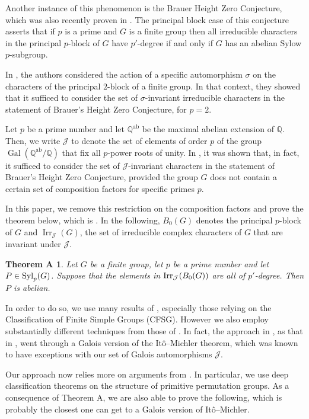 \documentclass[12pt]{amsart}
\theoremstyle{theorem}
\newtheorem*{thmA}{Theorem A}
\theoremstyle{definition}
\newcommand{\Irr}{{\operatorname{Irr}}}
\begin{document}
	Another instance of this phenomenon is the Brauer Height Zero Conjecture, which was also recently proven in \cite{BHZ}. The principal block case of this conjecture asserts that if $p$ is a prime and $G$ is a finite group then all irreducible characters in the principal $p$-block of $G$ have $p'$-degree if and only if $G$ has an abelian Sylow $p$-subgroup. 
	
	 In \cite{MN}, the authors considered the action of a specific automorphism $\sigma$ on the characters of the principal $2$-block of a finite group. In that context, they showed that it sufficed to consider the set of $\sigma$-invariant irreducible characters in the statement of Brauer's Height Zero Conjecture, for $p = 2$.
	 
	 Let $p$ be a prime number and let $\mathbb{Q}^{\operatorname{ab}}$ be the maximal abelian extension of $\mathbb{Q}$. Then, we write $\mathcal{J}$ to denote the set of elements of order $p$ of the group $\operatorname{Gal}(\mathbb{Q}^{\operatorname{ab}}/\mathbb{Q})$ that fix all $p$-power roots of unity. In \cite{MMRSF}, it was shown that, in fact, it sufficed to consider the set of $\mathcal{J}$-invariant characters in the statement of Brauer's Height Zero Conjecture, provided the group $G$ does not contain a certain set of composition factors for specific primes $p$.
	
	In this paper, we remove this restriction on the composition factors and prove the theorem below, which is \cite[Conjecture 1]{MMRSF}. In the following, $B_0(G)$ denotes the principal $p$-block of $G$ and $\Irr_{\mathcal{J}}(G)$, the set of irreducible complex characters of $G$ that are invariant under $\mathcal{J}$.
	
	\begin{thmA}
		Let $G$ be a finite group, let $p$ be a prime number and let $P\in{\rm Syl}_p(G)$. Suppose that the elements in ${\rm Irr}_{\mathcal{J}}(B_0(G))$ are all of $p'$-degree. Then $P$ is abelian.
	\end{thmA}
	
	In order to do so, we use many results of \cite{MMRSF}, especially those relying on the Classification of Finite Simple Groups (CFSG). However we also employ substantially different techniques from those of \cite{MMRSF}. In fact, the approach in \cite{MMRSF}, as that in \cite{MN}, went through a Galois version of the It\^o--Michler theorem, which was known to have  exceptions with our set of Galois automorphisms $\mathcal{J}$. 
	
Our approach now relies more on arguments from \cite{MinimalHeights}. In particular, we use deep classification theorems on the structure of primitive permutation groups. As a consequence of Theorem A, we are also able to prove the following, which is probably the closest one can get to a Galois version of It\^o--Michler.
	
\end{document}
